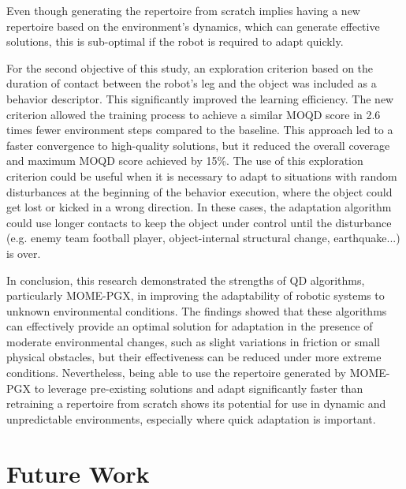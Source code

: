 \documentclass[12pt]{article}
\begin{document}
Even though generating the repertoire from scratch implies having a new repertoire based on the environment's dynamics, which can generate effective solutions, this is sub-optimal if the robot is required to adapt quickly.

For the second objective of this study, an exploration criterion based on the duration of contact between the robot’s leg and the object was included as a behavior descriptor. This significantly improved the learning efficiency. The new criterion allowed the training process to achieve a similar MOQD score in 2.6 times fewer environment steps compared to the baseline. This approach led to a faster convergence to high-quality solutions, but it reduced the overall coverage and maximum MOQD score achieved by 15\%. The use of this exploration criterion could be useful when it is necessary to adapt to situations with random disturbances at the beginning of the behavior execution, where the object could get lost or kicked in a wrong direction. In these cases, the adaptation algorithm could use longer contacts to keep the object under control until the disturbance (e.g. enemy team football player, object-internal structural change, earthquake...) is over.

In conclusion, this research demonstrated the strengths of QD algorithms, particularly MOME-PGX, in improving the adaptability of robotic systems to unknown environmental conditions. The findings showed that these algorithms can effectively provide an optimal solution for adaptation in the presence of moderate environmental changes, such as slight variations in friction or small physical obstacles, but their effectiveness can be reduced under more extreme conditions. Nevertheless, being able to use the repertoire generated by MOME-PGX to leverage pre-existing solutions and adapt significantly faster than retraining a repertoire from scratch shows its potential for use in dynamic and unpredictable environments, especially where quick adaptation is important. 

\section{Future Work}
\end{document}
